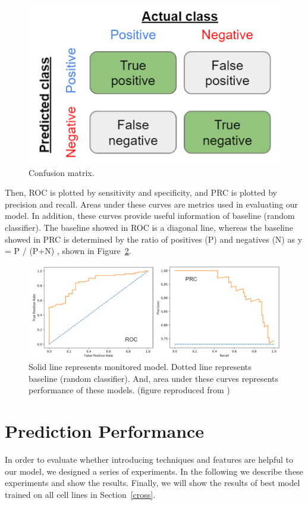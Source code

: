 \begin{figure}[H]
    \centering
    \includegraphics[width=0.65\columnwidth]{body/figure/figure14.png}
    \captionsetup{labelfont=bf}
    \caption[Confusion matrix]{Confusion matrix.}
    \label{f14}
\end{figure}

Then, ROC is plotted by sensitivity and specificity, and PRC is plotted by precision and recall. Areas under these curves are metrics used in evaluating our model. In addition, these curves provide useful information of baseline (random classifier). The baseline showed in ROC is a diagonal line, whereas the baseline showed in PRC is determined by the ratio of positives (P) and negatives (N) as y = P / (P+N) \cite{saito2015precision}, shown in Figure~\ref{f15}.

\begin{figure}[H]
    \centering
    \includegraphics[width=1\columnwidth]{body/figure/figure15.png}
    \vspace{-1cm}
    \captionsetup{labelfont=bf}
    \renewcommand{\baselinestretch}{1.0}
    \caption[ROC and PRC]{Solid line represents monitored model. Dotted line represents baseline (random classifier). And, area under these curves represents performance of these models. (figure reproduced from \cite{rocprc})}
    \label{f15}
\end{figure}

\section{Prediction Performance} \label{performance}
In order to evaluate whether introducing techniques and features are helpful to our model, we designed a series of experiments.  In the following we describe these experiments and show the results. Finally, we will show the results of best model trained on all cell lines in Section~\ref{cross}.

